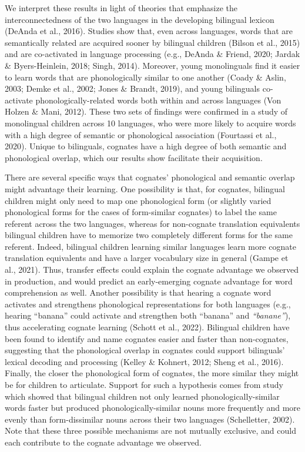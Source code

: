 \documentclass[
  ,man,floatsintext]{apa6}
\begin{document}
We interpret these results in light of theories that emphasize the interconnectedness of the two languages in the developing bilingual lexicon (DeAnda et al., 2016). Studies show that, even across languages, words that are semantically related are acquired sooner by bilingual children (Bilson et al., 2015) and are co-activated in language processing (e.g., DeAnda \& Friend, 2020; Jardak \& Byers-Heinlein, 2018; Singh, 2014). Moreover, young monolinguals find it easier to learn words that are phonologically similar to one another (Coady \& Aslin, 2003; Demke et al., 2002; Jones \& Brandt, 2019), and young bilinguals co-activate phonologically-related words both within and across languages (Von Holzen \& Mani, 2012). These two sets of findings were confirmed in a study of monolingual children across 10 languages, who were more likely to acquire words with a high degree of semantic or phonological association (Fourtassi et al., 2020). Unique to bilinguals, cognates have a high degree of both semantic and phonological overlap, which our results show facilitate their acquisition.

There are several specific ways that cognates' phonological and semantic overlap might advantage their learning. One possibility is that, for cognates, bilingual children might only need to map one phonological form (or slightly varied phonological forms for the cases of form-similar cognates) to label the same referent across the two languages, whereas for non-cognate translation equivalents bilingual children have to memorize two completely different forms for the same referent. Indeed, bilingual children learning similar languages learn more cognate translation equivalents and have a larger vocabulary size in general (Gampe et al., 2021). Thus, transfer effects could explain the cognate advantage we observed in production, and would predict an early-emerging cognate advantage for word comprehension as well. Another possibility is that hearing a cognate word activates and strengthens phonological representations for both languages (e.g., hearing ``banana'' could activate and strengthen both ``banana'' and \emph{``banane''}), thus accelerating cognate learning (Schott et al., 2022). Bilingual children have been found to identify and name cognates easier and faster than non-cognates, suggesting that the phonological overlap in cognates could support bilinguals' lexical decoding and processing (Kelley \& Kohnert, 2012; Sheng et al., 2016). Finally, the closer the phonological form of cognates, the more similar they might be for children to articulate. Support for such a hypothesis comes from study which showed that bilingual children not only learned phonologically-similar words faster but produced phonologically-similar nouns more frequently and more evenly than form-dissimilar nouns across their two languages (Schelletter, 2002). Note that these three possible mechanisms are not mutually exclusive, and could each contribute to the cognate advantage we observed.
\end{document}
